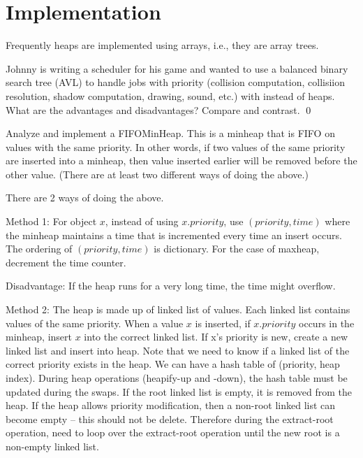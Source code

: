 \section{Implementation}

Frequently heaps are implemented using arrays,
i.e., they are array trees.

\newpage
\begin{ex}
  Johnny is writing
  a scheduler for his game
  and wanted to use a balanced binary search tree (AVL)
  to handle jobs with priority
  (collision computation, collisiion resolution, shadow computation,
  drawing, sound, etc.) with
  instead of heaps.
  What are the advantages and disadvantages?
  Compare and contrast.
  \qed
\end{ex}

\newpage
\begin{ex}
  Analyze and implement a FIFOMinHeap.
  This is a minheap that is FIFO on values with the
  same priority.
  In other words, if two values
  of the same priority
  are inserted into a minheap,
  then value inserted earlier will be
  removed before the other value.
  (There are at least two different ways of doing
  the above.)
\end{ex}


There are 2 ways of doing the above.

Method 1:
For object $x$, instead of using $x.priority$,
use $(priority, time)$ where the minheap maintains
a time that is incremented every time
an insert occurs. The ordering of $(priority, time)$
is dictionary.
For the case of maxheap, decrement the time counter.

Disadvantage: If the heap runs for a very long time,
the time might overflow.

Method 2:
The heap is made up of linked list of values.
Each linked list contains values of the same priority.
When a value $x$ is inserted, if $x.priority$ occurs in
the minheap, insert $x$ into the correct linked list.
If x's priority is new, create a new linked list and
insert into heap.
Note that we need to know if a linked list of the
correct priority exists in the heap.
We can have a hash table of (priority, heap index).
During heap operations (heapify-up and -down), the
hash table must be updated during the swaps.
If the root linked list is empty, it is removed from the heap.
If the heap allows priority modification, then
a non-root linked list can become empty -- this should not be
delete.
Therefore during the extract-root operation,
need to loop over the extract-root operation until
the new root is a non-empty linked list.

